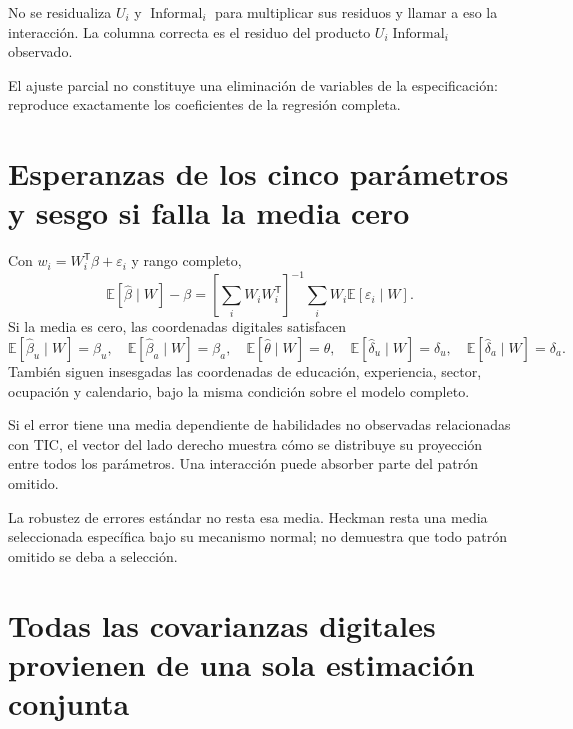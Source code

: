 \documentclass[11pt,a4paper]{article}
\newcommand{\E}{\mathbb E}
\begin{document}
No se residualiza $U_i$ y $\operatorname{Informal}_i$ para multiplicar sus residuos y llamar a eso la interacción. La columna correcta es el residuo del producto $U_i\operatorname{Informal}_i$ observado.

El ajuste parcial no constituye una eliminación de variables de la especificación: reproduce exactamente los coeficientes de la regresión completa.

\clearpage
\section{Esperanzas de los cinco parámetros y sesgo si falla la media cero}

Con $w_i=W_i^{\mathsf T}\beta+\varepsilon_i$ y rango completo,
\[
\E[\widehat\beta\mid W]-\beta
=\left[\sum_iW_iW_i^{\mathsf T}\right]^{-1}
\sum_iW_i\E[\varepsilon_i\mid W].
\]
Si la media es cero, las coordenadas digitales satisfacen
\[
\E[\widehat\beta_u\mid W]=\beta_u,\quad
\E[\widehat\beta_a\mid W]=\beta_a,\quad
\E[\widehat\theta\mid W]=\theta,\quad
\E[\widehat\delta_u\mid W]=\delta_u,\quad
\E[\widehat\delta_a\mid W]=\delta_a.
\]
También siguen insesgadas las coordenadas de educación, experiencia, sector, ocupación y calendario, bajo la misma condición sobre el modelo completo.

Si el error tiene una media dependiente de habilidades no observadas relacionadas con TIC, el vector del lado derecho muestra cómo se distribuye su proyección entre todos los parámetros. Una interacción puede absorber parte del patrón omitido.

La robustez de errores estándar no resta esa media. Heckman resta una media seleccionada específica bajo su mecanismo normal; no demuestra que todo patrón omitido se deba a selección.

\clearpage
\section{Todas las covarianzas digitales provienen de una sola estimación conjunta}
\end{document}
